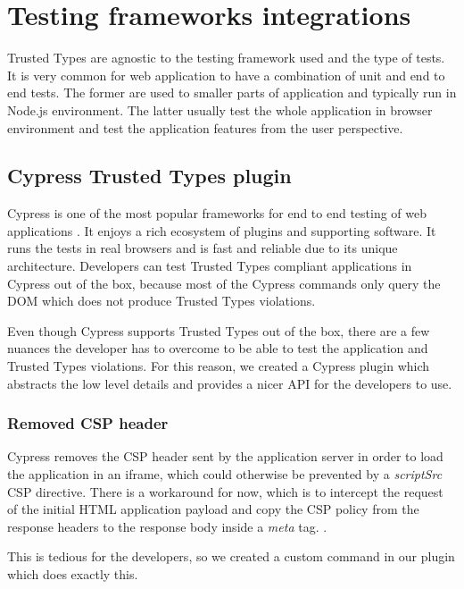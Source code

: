 \chapter{Testing frameworks integrations}


Trusted Types are agnostic to the testing framework used and the type of tests. It is very common
for web application to have a combination of unit and end to end tests. The former are used to
smaller parts of application and typically run in Node.js environment. The latter usually test the
whole application in browser environment and test the application features from the user
perspective.

\section{Cypress Trusted Types plugin}
\label{cypress_testing_plugin}

Cypress is one of the most popular frameworks for end to end testing of web applications
\cite{js_state:testing}. It enjoys a rich ecosystem of plugins and supporting software. It runs the
tests in real browsers and is fast and reliable due to its unique architecture. Developers can test
Trusted Types compliant applications in Cypress out of the box, because most of the Cypress commands
only query the DOM which does not produce Trusted Types violations.

Even though Cypress supports Trusted Types out of the box, there are a few
nuances the developer has to overcome to be able to test the application and Trusted Types
violations. For this reason, we created a Cypress plugin which abstracts the low level details
and provides a nicer API for the developers to use.

\subsection{Removed CSP header}

Cypress removes the CSP header sent by the application server in order to load the application in an
iframe, which could otherwise be prevented by a \emph{scriptSrc} CSP directive. There is a
workaround for now, which is to intercept the request of the initial HTML application payload and
copy the CSP policy from the response headers to the response body inside a \emph{meta} tag.
\cite{cypress:csp_removal_issue}.

This is tedious for the developers, so we created a custom command in our plugin which does
exactly this.

